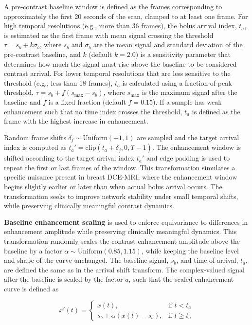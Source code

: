 \documentclass[runningheads]{llncs}
\begin{document}
A pre-contrast baseline window is defined as the frames corresponding to approximately the first 20 seconds of the scan, clamped to at least one frame. For high temporal resolutions (e.g., more than 36 frames), the bolus arrival index, $t_a$, is estimated as the first frame with mean signal crossing the threshold $\tau = s_b + k\sigma_b$, where $s_b$ and $\sigma_b$ are the mean signal and standard deviation of the pre-contrast baseline, and $k$ (default $k=2.0$) is a sensitivity parameter that determines how much the signal must rise above the baseline to be considered contrast arrival. For lower temporal resolutions that are less sensitive to the threshold (e.g., less than 18 frames), $t_a$ is calculated using a fraction-of-peak threshold, $\tau = s_b + f(s_\text{max} - s_b)$, where $s_\text{max}$ is the maximum signal after the baseline and $f$ is a fixed fraction (default $f=0.15$). If a sample has weak enhancement such that no time index crosses the threshold, $t_a$ is defined as the frame with the highest increase in enhancement.

Random frame shifts $\delta_j \sim \mathrm{Uniform}(-1,1)$ are sampled and the target arrival index is computed as $t_a' = \mathrm{clip}(t_a + \delta_j, 0, T-1)$. The enhancement window is shifted according to the target arrival index $t_a'$ and edge padding is used to repeat the first or last frames of the window. This transformation simulates a specific nuisance present in breast DCE-MRI, where the enhancement window begins slightly earlier or later than when actual bolus arrival occurs. The transformation seeks to improve network stability under small temporal shifts, while preserving clinically meaningful contrast dynamics. 

\textbf{Baseline enhancement scaling} is used to enforce equivariance to differences in enhancement amplitude while preserving clinically meaningful dynamics. This transformation randomly scales the contrast enhancement amplitude above the baseline by a factor $\alpha \sim \mathrm{Uniform}(0.85,1.15)$, while keeping the baseline level and shape of the curve unchanged. The baseline signal, $s_b$, and time-of-arrival, $t_a$, are defined the same as in the arrival shift transform. The complex-valued signal after the baseline is scaled by the factor $a$, such that the scaled enhancement curve is defined as 

\[
x'(t) = \begin{cases}
    x(t), & \text{if } t < t_a \\
    s_b + \alpha(x(t)-s_b), & \text{if } t \geq t_a
\end{cases}
\]
\end{document}
